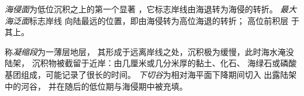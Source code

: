 \begin{definition}[海侵面与最大海泛面]\label{def:b3:sequence-stratigraphy:surfaces}
\emph{海侵面}为低位沉积之上的第一个显著
，它标志岸线由海退转为海侵的转折。
\emph{最大海泛面}标志岸线
向陆最远的位置，即由海侵转为高位海退的转折；
高位前积层
于其上。
\end{definition}

\begin{definition}[凝缩段与下切谷]\label{def:b3:sequence-stratigraphy:condensed}
称\emph{凝缩段}为一薄层地层，
其形成于远离岸线之处，沉积极为缓慢，此时海水淹没陆架，
沉积物被截留于近岸：由几厘米或几分米厚的黏土、化石、
海绿石或磷酸基团组成，可能记录了很长的时间。
\emph{下切谷}为相对海平面下降期间切入
出露陆架中的河谷，
并在随后的低位期与海侵期中被充填。
\end{definition}

